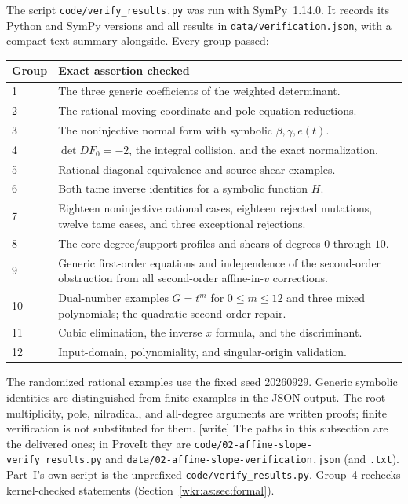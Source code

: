 \documentclass[11pt,a4paper]{article}
\numberwithin{equation}{section}
\theoremstyle{definition}
\theoremstyle{remark}
\newcommand{\rpath}[1]{\nolinkurl{#1}}
\begin{document}
The script \rpath{code/verify_results.py} was run with SymPy~1.14.0.
It records its Python and SymPy versions and all results in
\rpath{data/verification.json}, with a compact text summary alongside.
Every group passed:
\begin{center}
\small
\begin{tabular}{@{}p{}p{}@{}}
\toprule
Group & Exact assertion checked\\
\midrule
1 & The three generic coefficients of the weighted determinant.\\
2 & The rational moving-coordinate and pole-equation reductions.\\
3 & The noninjective normal form with symbolic $\beta,\gamma,e(t)$.\\
4 & $\det DF_0=-2$, the integral collision, and the exact normalization.\\
5 & Rational diagonal equivalence and source-shear examples.\\
6 & Both tame inverse identities for a symbolic function $H$.\\
7 & Eighteen noninjective rational cases, eighteen rejected mutations,
 twelve tame cases, and three exceptional rejections.\\
8 & The core degree/support profiles and shears of degrees $0$ through
 $10$.\\
9 & Generic first-order equations and independence of the second-order
 obstruction from all second-order affine-in-$v$ corrections.\\
10 & Dual-number examples $G=t^m$ for $0\le m\le12$ and three mixed
 polynomials; the quadratic second-order repair.\\
11 & Cubic elimination, the inverse $x$ formula, and the discriminant.\\
12 & Input-domain, polynomiality, and singular-origin validation.\\
\bottomrule
\end{tabular}
\end{center}
The randomized rational examples use the fixed seed $20260929$. Generic
symbolic identities are distinguished from finite examples in the JSON
output. The root-multiplicity, pole, nilradical, and all-degree arguments
are written proofs; finite verification is not substituted for them.
\textup{[write]} The paths in this subsection are the delivered ones; in
ProveIt they are \rpath{code/02-affine-slope-verify_results.py} and
\rpath{data/02-affine-slope-verification.json} (and \texttt{.txt}).
Part~I's own script is the unprefixed \rpath{code/verify_results.py}.
Group~4 rechecks kernel-checked statements
(Section~\ref{wkr:as:sec:formal}).
\end{document}
